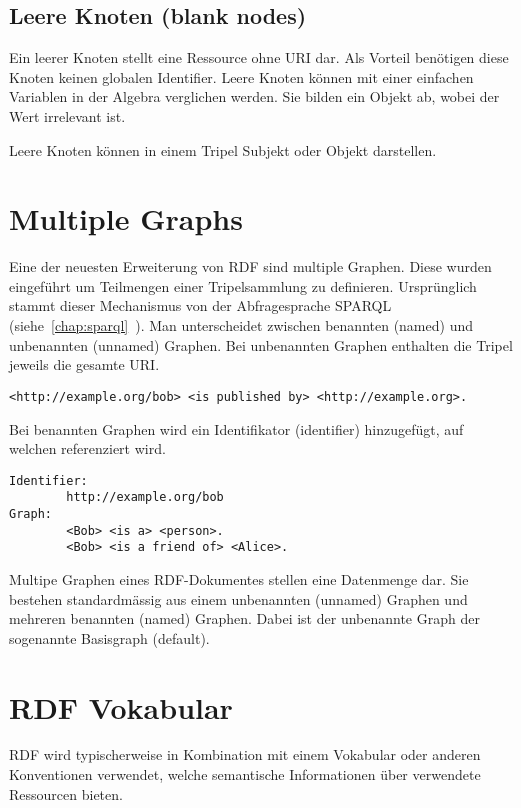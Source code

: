 \subsection{Leere Knoten (blank nodes)}
\label{sec:rdf_rdf_dataModel_blankNodes}
Ein leerer Knoten stellt eine Ressource ohne URI dar. Als Vorteil benötigen diese Knoten keinen globalen Identifier. Leere Knoten können mit einer einfachen Variablen in der Algebra verglichen werden. Sie bilden ein Objekt ab, wobei der Wert irrelevant ist.

Leere Knoten können in einem Tripel Subjekt oder Objekt darstellen.

\section{Multiple Graphs}
\label{sec:owlRdf_rdf_dataModel_multipleGraphs}
Eine der neuesten Erweiterung von RDF sind multiple Graphen. Diese wurden eingeführt um Teilmengen einer Tripelsammlung zu definieren. Ursprünglich stammt dieser Mechanismus von der Abfragesprache SPARQL (siehe~\ref{chap:sparql}~). Man unterscheidet zwischen benannten (named) und unbenannten (unnamed) Graphen. Bei unbenannten Graphen enthalten die Tripel jeweils die gesamte URI.\@

\begin{lstlisting}[caption={Beispiel eines unbenannten (unnamed) Graphen}]
    <http://example.org/bob> <is published by> <http://example.org>.
\end{lstlisting}

Bei benannten Graphen wird ein Identifikator (identifier) hinzugefügt, auf welchen referenziert wird.

\begin{lstlisting}[caption={Beispiel eines benannten (named) Graphen}]
Identifier: 
        http://example.org/bob
Graph:
        <Bob> <is a> <person>.
        <Bob> <is a friend of> <Alice>.
\end{lstlisting}

Multipe Graphen eines RDF-Dokumentes stellen eine Datenmenge dar. Sie bestehen standardmässig aus einem unbenannten (unnamed) Graphen und mehreren benannten (named) Graphen. Dabei ist der unbenannte Graph der sogenannte Basisgraph (default).

\section{RDF Vokabular}
\label{sec:rdf_rdf_voca}
RDF wird typischerweise in Kombination mit einem Vokabular oder anderen Konventionen verwendet, welche semantische Informationen über verwendete Ressourcen bieten.

